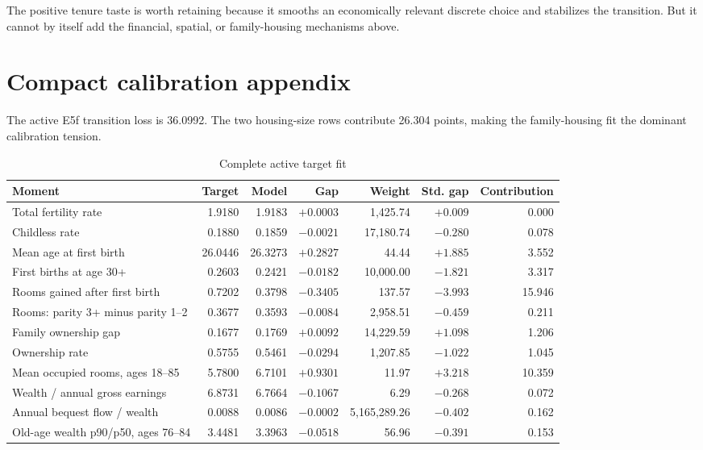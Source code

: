 \documentclass[10pt]{article}
\begin{document}
The positive tenure taste is worth retaining because it smooths an economically relevant discrete choice and stabilizes the transition. But it cannot by itself add the financial, spatial, or family-housing mechanisms above.

\newpage
\section*{Compact calibration appendix}

The active E5f transition loss is 36.0992. The two housing-size rows contribute 26.304 points, making the family-housing fit the dominant calibration tension.

\begin{table}[h]
\centering
\caption{Complete active target fit}
\scriptsize
\begin{tabularx}{\textwidth}{>{\raggedright\arraybackslash}Xrrrrrr}
\toprule
Moment & Target & Model & Gap & Weight & Std. gap & Contribution \\
\midrule
Total fertility rate & 1.9180 & 1.9183 & $+0.0003$ & 1,425.74 & $+0.009$ & 0.000 \\
Childless rate & 0.1880 & 0.1859 & $-0.0021$ & 17,180.74 & $-0.280$ & 0.078 \\
Mean age at first birth & 26.0446 & 26.3273 & $+0.2827$ & 44.44 & $+1.885$ & 3.552 \\
First births at age 30+ & 0.2603 & 0.2421 & $-0.0182$ & 10,000.00 & $-1.821$ & 3.317 \\
Rooms gained after first birth & 0.7202 & 0.3798 & $-0.3405$ & 137.57 & $-3.993$ & 15.946 \\
Rooms: parity 3+ minus parity 1--2 & 0.3677 & 0.3593 & $-0.0084$ & 2,958.51 & $-0.459$ & 0.211 \\
Family ownership gap & 0.1677 & 0.1769 & $+0.0092$ & 14,229.59 & $+1.098$ & 1.206 \\
Ownership rate & 0.5755 & 0.5461 & $-0.0294$ & 1,207.85 & $-1.022$ & 1.045 \\
Mean occupied rooms, ages 18--85 & 5.7800 & 6.7101 & $+0.9301$ & 11.97 & $+3.218$ & 10.359 \\
Wealth / annual gross earnings & 6.8731 & 6.7664 & $-0.1067$ & 6.29 & $-0.268$ & 0.072 \\
Annual bequest flow / wealth & 0.0088 & 0.0086 & $-0.0002$ & 5,165,289.26 & $-0.402$ & 0.162 \\
Old-age wealth p90/p50, ages 76--84 & 3.4481 & 3.3963 & $-0.0518$ & 56.96 & $-0.391$ & 0.153 \\
\bottomrule
\end{tabularx}
\end{table}
\end{document}
